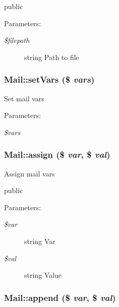 public \begin{Desc}
\item[Parameters:]
\begin{description}
\item[{\em \$filepath}]string Path to file \end{description}
\end{Desc}
\hypertarget{classMail_d6c0374d8c7e8652abe5ab62ba66e43c}{
\subsubsection[setVars]{\setlength{\rightskip}{0pt plus 5cm}Mail::setVars (\$ {\em vars})}}
\label{classMail_d6c0374d8c7e8652abe5ab62ba66e43c}


Set mail vars

\begin{Desc}
\item[Parameters:]
\begin{description}
\item[{\em \$vars}]\end{description}
\end{Desc}
\hypertarget{classMail_a3b066baef0428c4647d53adcc4f7db1}{
\subsubsection[assign]{\setlength{\rightskip}{0pt plus 5cm}Mail::assign (\$ {\em var}, \/  \$ {\em val})}}
\label{classMail_a3b066baef0428c4647d53adcc4f7db1}


Assign mail vars

public \begin{Desc}
\item[Parameters:]
\begin{description}
\item[{\em \$var}]string Var \item[{\em \$val}]string Value \end{description}
\end{Desc}
\hypertarget{classMail_ba85602bb95d1882d965bda635ef6ffe}{
\subsubsection[append]{\setlength{\rightskip}{0pt plus 5cm}Mail::append (\$ {\em var}, \/  \$ {\em val})}}
\label{classMail_ba85602bb95d1882d965bda635ef6ffe}


